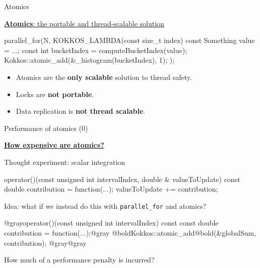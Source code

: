 \begin{frame}[fragile]{Atomics}

  \ul{\textbf{Atomics}: the portable and thread-scalable solution}

  \begin{code}[linebackgroundcolor={
      },
      keywords={}, frame=single
    ]
parallel_for(N, KOKKOS_LAMBDA(const size_t index) {
    const Something value = ...;
    const int bucketIndex = computeBucketIndex(value);
    Kokkos::atomic_add(&_histogram(bucketIndex), 1);
  });
  \end{code}

  \pause
  \vspace{0pt}

  \begin{itemize}[<+->]
    \item {Atomics are the \textbf{only scalable} solution to thread safety.}
    \item {Locks are \textbf{not portable}.}
    \item {Data replication is \textbf{not thread scalable}.}
  \end{itemize}

  \vspace{0pt}

\end{frame}


\begin{frame}[fragile]{Performance of atomics (0)}

  \ul{\textbf{How expensive are atomics?}}

  \vspace{10pt}

  Thought experiment: scalar integration

  \begin{code}[linebackgroundcolor={
      },
      keywords={}
    ]
operator()(const unsigned int intervalIndex,
           double & valueToUpdate) const {
  double contribution = function(...);
  valueToUpdate += contribution;
}
  \end{code}

  \pause
  \vspace{10pt}
  Idea: what if we instead do this with \texttt{parallel\_for} and atomics?

  \begin{code}[linebackgroundcolor={
      },
      keywords={}
    ]
@grayoperator()(const unsigned int intervalIndex) const {
  const double contribution = function(...);@gray
  @boldKokkos::atomic_add@bold(&globalSum, contribution);
@gray}@gray
  \end{code}

  \vspace{0pt}
  How much of a performance penalty is incurred?

\end{frame}

